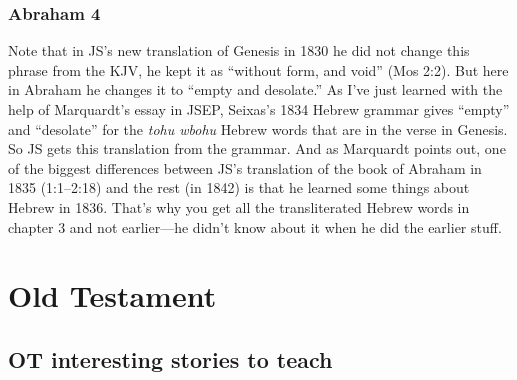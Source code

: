 	\subsubsection{Abraham 4} %
	
		\begin{compactdesc}
		
		\item[2$\vert$]
		\begin{compactdesc}
		\item[empty and desolate] Note that in JS's new translation of Genesis in 1830 he did not change this phrase from the KJV, he kept it as ``without form, and void'' (Mos 2:2). But here in Abraham he changes it to ``empty and desolate.'' As I've just learned with the help of Marquardt's essay in JSEP, Seixas's 1834 Hebrew grammar gives ``empty'' and ``desolate'' for the \textit{tohu wbohu} Hebrew words that are in the verse in Genesis. So JS gets this translation from the grammar.
			And as Marquardt points out, one of the biggest differences between JS's translation of the book of Abraham in 1835 (1:1--2:18) and the rest (in 1842) is that he learned some things about Hebrew in 1836. That's why you get all the transliterated Hebrew words in chapter 3 and not earlier---he didn't know about it when he did the earlier stuff.
		\end{compactdesc}
		
		\end{compactdesc}

\section{Old Testament}

\subsection{OT interesting stories to teach} %

